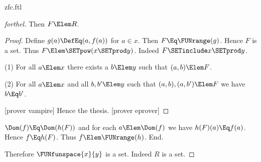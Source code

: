 \documentclass{stex}
\begin{document}
\begin{smodule}{zfc.ftl}
\begin{proof}[forthel]
    Then $F \Elem R$.
    \begin{proof}
      Define $g(a) \DefEq (a,f(a))$ for $a \in x$.
      Then $F \Eq \FUNrange(g)$.
      Hence $F$ is a set.
      Thus $F \Elem \SETpow(x \SETprod y)$.
      Indeed $F \SETinclude x \SETprod y$.

      (1) For all $a \Elem x$ there exists a $b \Elem y$ such that $(a,b) \Elem F$.

      (2) For all $a \Elem x$ and all $b, b' \Elem y$ such that $(a,b),
      (a,b') \Elem F$ we have $b \Eq b'$.

      [prover vampire]
      Hence the thesis.
      [prover eprover]
    \end{proof}

    $\Dom(f) \Eq \Dom(h(F))$ and for each $a \Elem \Dom(f)$ we have $h(F)(a) \Eq f(a)$.
    Hence $f \Eq h(F)$.
    Thus $f \Elem \FUNrange(h)$.
  End.

  Therefore $\FUNfunspace{x}{y}$ is a set.
  Indeed $R$ is a set.
\end{proof}
\end{smodule}
\end{document}
